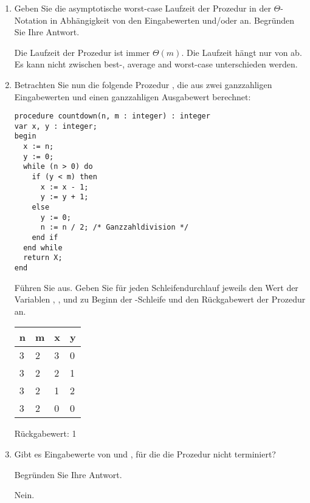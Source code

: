\documentclass{lehramt-informatik-aufgabe}
\begin{document}
\begin{enumerate}

\item Geben Sie die asymptotische worst-case Laufzeit der Prozedur
 in der $\Theta$-Notation in Abhängigkeit von den
Eingabewerten  und/oder  an. Begründen Sie Ihre Antwort.

\begin{liAntwort}
Die Laufzeit der Prozedur ist immer $\Theta(m)$. Die Laufzeit hängt nur
von  ab. Es kann nicht zwischen best-, average and worst-case
unterschieden werden.
\end{liAntwort}

\item

Betrachten Sie nun die folgende Prozedur , die aus zwei
ganzzahligen Eingabewerten  und  einen ganzzahligen
Ausgabewert berechnet:

\begin{verbatim}
procedure countdown(n, m : integer) : integer
var x, y : integer;
begin
  x := n;
  y := 0;
  while (n > 0) do
    if (y < m) then
      x := x - 1;
      y := y + 1;
    else
      y := 0;
      n := n / 2; /* Ganzzahldivision */
    end if
  end while
  return X;
end
\end{verbatim}

Führen Sie  aus. Geben Sie für jeden
Schleifendurchlauf jeweils den Wert der Variablen , , 
und  zu Beginn der -Schleife und den Rückgabewert der
Prozedur an.

\begin{liAntwort}
\begin{tabular}{llll}
n & m & x & y \\\hline
3 & 2 & 3 & 0 \\
3 & 2 & 2 & 1 \\
3 & 2 & 1 & 2 \\
3 & 2 & 0 & 0 \\
\end{tabular}

Rückgabewert: 1
\end{liAntwort}


\item Gibt es Eingabewerte von  und , für die die Prozedur
 nicht terminiert?

Begründen Sie Ihre Antwort.

\begin{liAntwort}
Nein.


\end{liAntwort}
\end{enumerate}
\end{document}
